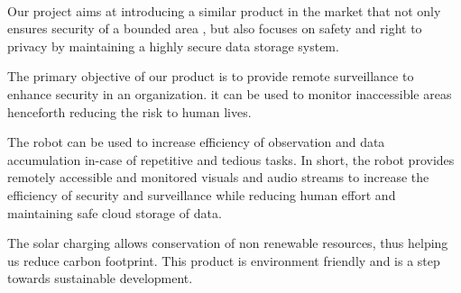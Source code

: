 \paragraph{}Our project aims at introducing a similar product in the market that not only ensures security of a bounded area , but also focuses on safety and right to privacy by maintaining a highly secure data storage system.
\newline

The primary objective of our product is to provide remote surveillance to enhance security in an organization. it can be used to monitor inaccessible areas henceforth reducing the risk to human lives.
\newline

The robot can be used to increase efficiency of observation and data accumulation in-case of repetitive and tedious tasks. In short, the robot provides remotely accessible and monitored visuals and audio streams to increase the efficiency of security and surveillance while reducing human effort and maintaining safe cloud storage of data.
\newline

The solar charging allows conservation of non renewable resources, thus helping us reduce carbon footprint. This product is environment friendly and is a step towards sustainable development.
